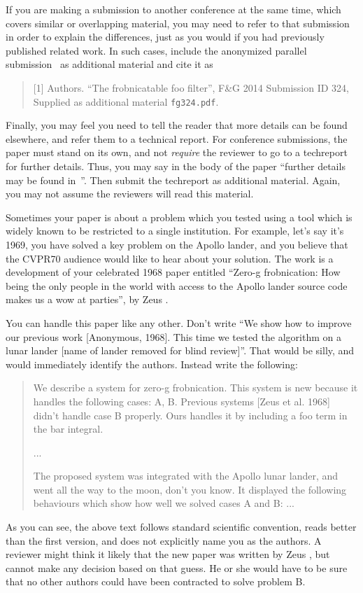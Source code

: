 \documentclass[10pt,twocolumn,letterpaper]{article}
\begin{document}
	If you are making a submission to another conference at the same time,
	which covers similar or overlapping material, you may need to refer to that
	submission in order to explain the differences, just as you would if you
	had previously published related work.  In such cases, include the
	anonymized parallel submission~\cite{Authors14} as additional material and
	cite it as
	\begin{quote}
		[1] Authors. ``The frobnicatable foo filter'', F\&G 2014 Submission ID 324,
		Supplied as additional material {\tt fg324.pdf}.
	\end{quote}
	
	Finally, you may feel you need to tell the reader that more details can be
	found elsewhere, and refer them to a technical report.  For conference
	submissions, the paper must stand on its own, and not {\em require} the
	reviewer to go to a techreport for further details.  Thus, you may say in
	the body of the paper ``further details may be found
	in~\cite{Authors14b}''.  Then submit the techreport as additional material.
	Again, you may not assume the reviewers will read this material.
	
	Sometimes your paper is about a problem which you tested using a tool which
	is widely known to be restricted to a single institution.  For example,
	let's say it's 1969, you have solved a key problem on the Apollo lander,
	and you believe that the CVPR70 audience would like to hear about your
	solution.  The work is a development of your celebrated 1968 paper entitled
	``Zero-g frobnication: How being the only people in the world with access to
	the Apollo lander source code makes us a wow at parties'', by Zeus \etal.
	
	You can handle this paper like any other.  Don't write ``We show how to
	improve our previous work [Anonymous, 1968].  This time we tested the
	algorithm on a lunar lander [name of lander removed for blind review]''.
	That would be silly, and would immediately identify the authors. Instead
	write the following:
	\begin{quotation}
		\noindent
		We describe a system for zero-g frobnication.  This
		system is new because it handles the following cases:
		A, B.  Previous systems [Zeus et al. 1968] didn't
		handle case B properly.  Ours handles it by including
		a foo term in the bar integral.
		
		...
		
		The proposed system was integrated with the Apollo
		lunar lander, and went all the way to the moon, don't
		you know.  It displayed the following behaviours
		which show how well we solved cases A and B: ...
	\end{quotation}
	As you can see, the above text follows standard scientific convention,
	reads better than the first version, and does not explicitly name you as
	the authors.  A reviewer might think it likely that the new paper was
	written by Zeus \etal, but cannot make any decision based on that guess.
	He or she would have to be sure that no other authors could have been
	contracted to solve problem B.
	\medskip
	
\end{document}
